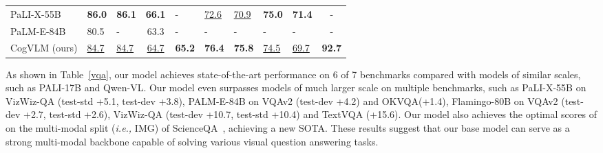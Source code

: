 \begin{table*}[htbp]
{{\begin{tabular}{lp{0.8cm}p{0.8cm}cp{1.2cm}p{0.8cm}p{0.8cm}>{\centering}p{1.2cm}>{\centering}p{1.2cm}c}
        PaLI-X-55B~\citep{chen2023pali} & \textbf{86.0} & \textbf{86.1} & \textbf{66.1} & - & \underline{72.6} & \underline{70.9} & \textbf{75.0}  & \textbf{71.4} & -\\
        PaLM-E-84B~\citep{driess2023palm} & 80.5 & - & 63.3 & - & - & - & - & - & -\\
\hline
        CogVLM (ours) & \underline{84.7} & \underline{84.7} & \underline{64.7} & \textbf{65.2} & \textbf{76.4} & \textbf{75.8} & \underline{74.5}  & \underline{69.7} & \textbf{92.7}\\
\bottomrule
    \end{tabular}
  }
 }
\label{vqa}
\end{table*}



 As shown in Table~\ref{vqa}, our model achieves state-of-the-art performance on 6 of 7 benchmarks compared with models of similar scales, such as PALI-17B and Qwen-VL. Our model even surpasses models of much larger scale on multiple benchmarks, such as PaLI-X-55B on VizWiz-QA (test-std +5.1, test-dev +3.8), PALM-E-84B on VQAv2 (test-dev +4.2) and OKVQA(+1.4), Flamingo-80B on VQAv2 (test-dev +2.7, test-std +2.6), VizWiz-QA (test-dev +10.7, test-std +10.4) and TextVQA (+15.6).
Our model also achieves the optimal scores of  on the multi-modal split (\emph{i.e.,} IMG) of ScienceQA~\citep{lu2022learn}, achieving a new SOTA.
These results suggest that our base model can serve as a strong multi-modal backbone capable of solving various visual question answering tasks.

